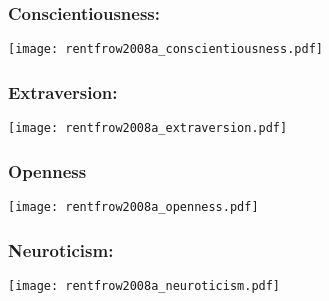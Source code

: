 \begin{frame}
  \frametitle{Conscientiousness:}

  \texttt{[image: rentfrow2008a\_conscientiousness.pdf]}

\end{frame}

\begin{frame}
  \frametitle{Extraversion:}

  \texttt{[image: rentfrow2008a\_extraversion.pdf]}

\end{frame}

\begin{frame}
  \frametitle{Openness}

  \texttt{[image: rentfrow2008a\_openness.pdf]}

\end{frame}

\begin{frame}
  \frametitle{Neuroticism:}

  \texttt{[image: rentfrow2008a\_neuroticism.pdf]}

\end{frame}

